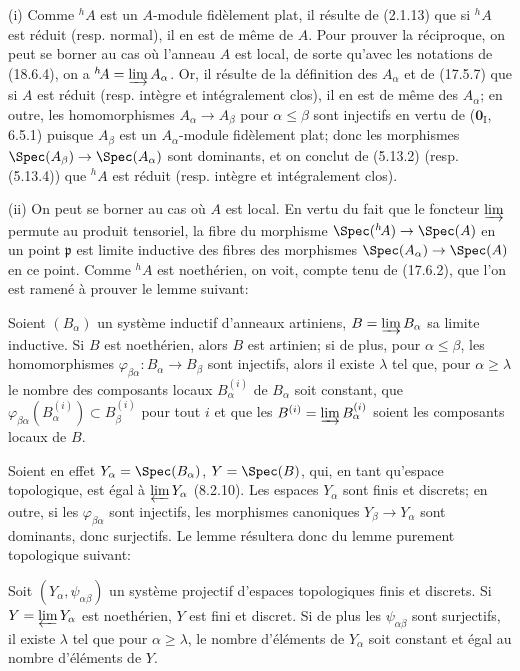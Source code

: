
(i) Comme ${}^h\!A$ est un $A$-module fidèlement plat, il résulte de (2.1.13) que si ${}^h\!A$ est réduit (resp. normal), il en est de même de $A$. Pour prouver la réciproque, on peut se borner au cas où l'anneau $A$ est local, de sorte qu'avec les notations de (18.6.4), on a ${}^h\!A=\varinjlim A_\alpha$. Or, il résulte de la définition des $A_\alpha$ et de (17.5.7) que si $A$ est réduit (resp. intègre et intégralement clos), il en est de même des $A_\alpha$; en outre, les homomorphismes $A_\alpha\to A_\beta$ pour $\alpha\leq\beta$ sont injectifs en vertu de ($\mathbf{0}_{\mathrm I}$, 6.5.1) puisque $A_\beta$ est un $A_\alpha$-module fidèlement plat; donc les morphismes $\Spec(A_\beta)\to\Spec(A_\alpha)$ sont dominants, et on conclut de (5.13.2) (resp. (5.13.4)) que ${}^h\!A$ est réduit (resp. intègre et intégralement clos).

(ii) On peut se borner au cas où $A$ est local. En vertu du fait que le foncteur $\varinjlim$ permute au produit tensoriel, la fibre du morphisme $\Spec({}^h\!A)\to\Spec(A)$ en un point $\mathfrak p$ est limite inductive des fibres des morphismes $\Spec(A_\alpha)\to\Spec(A)$ en ce point. Comme ${}^h\!A$ est noethérien, on voit, compte tenu de (17.6.2), que l'on est ramené à prouver le lemme suivant:

\begin{lemma}[18.6.9.1]
\label{IV.18.6.9.1}
Soient $(B_\alpha)$ un système inductif d'anneaux artiniens, $B=\varinjlim B_\alpha$ sa limite inductive. Si $B$ est noethérien, alors $B$ est artinien; si de plus, pour $\alpha\leq\beta$, les homomorphismes $\varphi_{\beta\alpha}:B_\alpha\to B_\beta$ sont injectifs, alors il existe $\lambda$ tel que, pour $\alpha\geq\lambda$ le nombre des composants locaux $B_\alpha^{(i)}$ de $B_\alpha$ soit constant, que $\varphi_{\beta\alpha}(B_\alpha^{(i)})\subset B_\beta^{(i)}$ pour tout $i$ et que les $B^{(i)}=\varinjlim B_\alpha^{(i)}$ soient les composants locaux de $B$.
\end{lemma}

Soient en effet $Y_\alpha=\Spec(B_\alpha)$, $Y=\Spec(B)$, qui, en tant qu'espace topologique, est égal à $\varprojlim Y_\alpha$ (8.2.10). Les espaces $Y_\alpha$ sont finis et discrets; en outre, si les $\varphi_{\beta\alpha}$ sont injectifs, les morphismes canoniques $Y_\beta\to Y_\alpha$ sont dominants, donc surjectifs. Le lemme résultera donc du lemme purement topologique suivant:

\begin{lemma}[18.6.9.2]
\label{IV.18.6.9.2}
Soit $(Y_\alpha,\psi_{\alpha\beta})$ un système projectif d'espaces topologiques finis et discrets. Si $Y=\varprojlim Y_\alpha$ est noethérien, $Y$ est fini et discret. Si de plus les $\psi_{\alpha\beta}$ sont surjectifs, il existe $\lambda$ tel que pour $\alpha\geq\lambda$, le nombre d'éléments de $Y_\alpha$ soit constant et égal au nombre d'éléments de $Y$.
\end{lemma}

